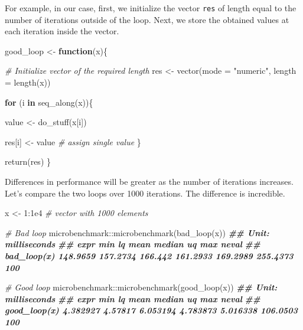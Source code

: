 \documentclass[
  11pt,
]{book}
\newenvironment{Shaded}{\begin{snugshade}}{\end{snugshade}}
\newcommand{\AttributeTok}[1]{\textcolor[rgb]{0.77,0.63,0.00}{#1}}
\newcommand{\CommentTok}[1]{\textcolor[rgb]{0.56,0.35,0.01}{\textit{#1}}}
\newcommand{\ControlFlowTok}[1]{\textcolor[rgb]{0.13,0.29,0.53}{\textbf{#1}}}
\newcommand{\DecValTok}[1]{\textcolor[rgb]{0.00,0.00,0.81}{#1}}
\newcommand{\DocumentationTok}[1]{\textcolor[rgb]{0.56,0.35,0.01}{\textbf{\textit{#1}}}}
\newcommand{\FloatTok}[1]{\textcolor[rgb]{0.00,0.00,0.81}{#1}}
\newcommand{\FunctionTok}[1]{\textcolor[rgb]{0.00,0.00,0.00}{#1}}
\newcommand{\NormalTok}[1]{#1}
\newcommand{\OtherTok}[1]{\textcolor[rgb]{0.56,0.35,0.01}{#1}}
\newcommand{\SpecialCharTok}[1]{\textcolor[rgb]{0.00,0.00,0.00}{#1}}
\newcommand{\StringTok}[1]{\textcolor[rgb]{0.31,0.60,0.02}{#1}}
\newenvironment{code-tex-good}
  {\begingroup\definecolor{shadecolor}{RGB}{224, 240, 227}}
  {\endgroup}
\begin{document}
\begin{itemize}
  For example, in our case, first, we initialize the vector \texttt{res} of length equal to the number of iterations outside of the loop. Next, we store the obtained values at each iteration inside the vector.

  \begin{code-tex-good}

\begin{Shaded}
\begin{Highlighting}[]
\NormalTok{good\_loop }\OtherTok{\textless{}{-}} \ControlFlowTok{function}\NormalTok{(x)\{}

  \CommentTok{\# Initialize vector of the required length}
\NormalTok{  res }\OtherTok{\textless{}{-}} \FunctionTok{vector}\NormalTok{(}\AttributeTok{mode =} \StringTok{"numeric"}\NormalTok{, }\AttributeTok{length =} \FunctionTok{length}\NormalTok{(x))}

  \ControlFlowTok{for}\NormalTok{ (i }\ControlFlowTok{in} \FunctionTok{seq\_along}\NormalTok{(x))\{}

\NormalTok{    value }\OtherTok{\textless{}{-}} \FunctionTok{do\_stuff}\NormalTok{(x[i])}

\NormalTok{    res[i] }\OtherTok{\textless{}{-}}\NormalTok{ value }\CommentTok{\# assign single value}
\NormalTok{  \}}

  \FunctionTok{return}\NormalTok{(res)}
\NormalTok{\}}
\end{Highlighting}
\end{Shaded}

  \end{code-tex-good}

  Differences in performance will be greater as the number of iterations increases. Let's compare the two loops over 1000 iterations. The difference is incredible.

\begin{Shaded}
\begin{Highlighting}[]
\NormalTok{x }\OtherTok{\textless{}{-}} \DecValTok{1}\SpecialCharTok{:}\FloatTok{1e4} \CommentTok{\# vector with 1000 elements}

\CommentTok{\# Bad loop}
\NormalTok{microbenchmark}\SpecialCharTok{::}\FunctionTok{microbenchmark}\NormalTok{(}\FunctionTok{bad\_loop}\NormalTok{(x))}
\DocumentationTok{\#\# Unit: milliseconds}
\DocumentationTok{\#\#         expr      min       lq    mean   median       uq      max neval}
\DocumentationTok{\#\#  bad\_loop(x) 148.9659 157.2734 166.442 161.2933 169.2989 255.4373   100}

\CommentTok{\# Good loop}
\NormalTok{microbenchmark}\SpecialCharTok{::}\FunctionTok{microbenchmark}\NormalTok{(}\FunctionTok{good\_loop}\NormalTok{(x))}
\DocumentationTok{\#\# Unit: milliseconds}
\DocumentationTok{\#\#          expr      min      lq     mean   median       uq      max neval}
\DocumentationTok{\#\#  good\_loop(x) 4.382927 4.57817 6.053194 4.783873 5.016338 106.0503   100}
\end{Highlighting}
\end{Shaded}


\end{itemize}
\end{document}
